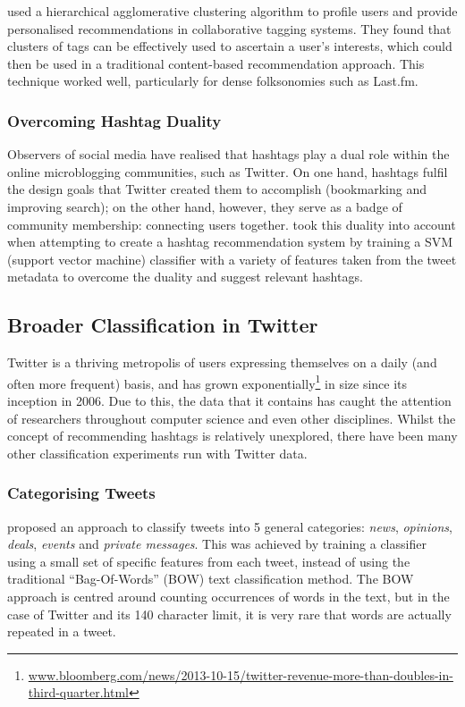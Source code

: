\documentclass[12pt,a4paper]{article}
\begin{document}
\textcite{Shepitsen:2008} used a hierarchical agglomerative clustering algorithm to profile users and provide personalised recommendations in collaborative tagging systems. They found that clusters of tags can be effectively used to ascertain a user's interests, which could then be used in a traditional content-based recommendation approach. This technique worked well, particularly for dense folksonomies such as Last.fm.

\subsubsection{Overcoming Hashtag Duality}
Observers of social media have realised that hashtags play a dual role within the online microblogging communities, such as Twitter. On one hand, hashtags fulfil the design goals that Twitter created them to accomplish (bookmarking and improving search); on the other hand, however, they serve as a badge of community membership: connecting users together. \textcite{Yang:2012} took this duality into account when attempting to create a hashtag recommendation system by training a SVM (support vector machine) classifier with a variety of features taken from the tweet metadata to overcome the duality and suggest relevant hashtags.

\subsection{Broader Classification in Twitter}
Twitter is a thriving metropolis of users expressing themselves on a daily (and often more frequent) basis, and has grown exponentially\footnote{\url{www.bloomberg.com/news/2013-10-15/twitter-revenue-more-than-doubles-in-third-quarter.html}} in size since its inception in 2006. Due to this, the data that it contains has caught the attention of researchers throughout computer science and even other disciplines. Whilst the concept of recommending hashtags is relatively unexplored, there have been many other classification experiments run with Twitter data.

\subsubsection{Categorising Tweets}
\textcite{Sriram:2010} proposed an approach to classify tweets into 5 general categories: \emph{news}, \emph{opinions}, \emph{deals}, \emph{events} and \emph{private messages}. This was achieved by training a classifier using a small set of specific features from each tweet, instead of using the traditional ``Bag-Of-Words'' (BOW) text classification method. The BOW approach is centred around counting occurrences of words in the text, but in the case of Twitter and its 140 character limit, it is very rare that words are actually repeated in a tweet.
\end{document}
